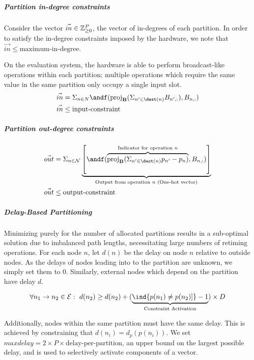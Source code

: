 
\subparagraph{Partition in-degree constraints}
Consider the vector $\vec{in} \in \mathbb{Z}_{\ge 0}^{P}$, the vector of in-degrees of each partition. In order to satisfy the in-degree constraints imposed by the hardware, we note that $\vec{in} \le \text{maximum-in-degree}$.

On the evaluation system, the hardware is able to perform broadcast-like operations within each partition; multiple operations which require the same value in the same partition only occupy a single input slot.
\begin{align}
\vec{in} &= \Sigma_{n \in N} \andf(\projb{\Sigma_{n' \in \dest(n)} B_{n', :}}, B_{n, :})\\
\vec{in} &\le \textrm{input-constraint}
\end{align}

\subparagraph{Partition out-degree constraints}

\begin{align}
\vec{out} &= \Sigma_{n \in \mathcal{N}} \underbrace{\left[ \andf ( \overbrace{\projb{\Sigma_{n' \in \dest(n)} p_{n'}  - p_{n}}}^{\textrm{Indicator for operation }n}, B_{n, :} ) \right]}_{\textrm{Output from operation } n \textrm{ (One-hot vector)}}\\
\vec{out}&\le \textrm{output-constraint}
\end{align}



\subparagraph{Delay-Based Partitioning}
Minimizing purely for the number of allocated partitions results in a sub-optimal solution due to imbalanced path lengths, necessitating large numbers of retiming operations. For each node $n$, let $d(n)$ be the delay on node $n$ relative to outside nodes. As the delays of nodes leading into to the partition are unknown, we simply set them to $0$. Similarly, external nodes which depend on the partition have delay $d$.

\begin{align}
	\forall n_1 \to n_2 \in \mathcal{E}:\ d(n_2) \ge d(n_2) + (\underbrace{\ind{p(n_1) \ne p(n_2)]}- 1}_{\text{Constraint Activation}}) \times D
\end{align}

Additionally, nodes within the same partition must have the same delay. This is achieved by constraining that $d(n_i) = d_p(p(n_i))$. We set $maxdelay = 2 \times P \times \text{delay-per-partition}$, an upper bound on the largest possible delay, and is used to selectively activate components of a vector.

